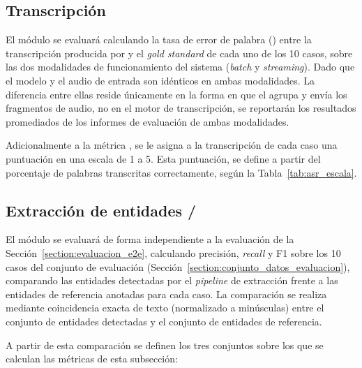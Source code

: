 \subsection{Transcripción }\label{subsection:evaluacion_asr}

El módulo  se evaluará calculando la tasa de error de palabra () entre la transcripción producida por  y el \textit{gold
standard} de cada uno de los 10 casos, sobre las dos modalidades de funcionamiento del sistema
(\textit{batch} y \textit{streaming}). Dado que el modelo  y el
audio de entrada son idénticos en ambas modalidades. La diferencia entre ellas reside únicamente
en la forma en que el  agrupa y envía los fragmentos de audio, no en el motor de
transcripción, se reportarán los resultados promediados de los informes de evaluación de ambas
modalidades.

Adicionalmente a la métrica , se le asigna a la transcripción de cada caso una
puntuación en una escala de 1 a 5. Esta puntuación, se define a partir
del porcentaje de palabras transcritas correctamente, según la Tabla~\ref{tab:asr_escala}.



\subsection{Extracción de entidades /}\label{subsection:evaluacion_pln}

El módulo  se evaluará de forma independiente a la evaluación
 de la Sección~\ref{section:evaluacion_e2e}, calculando precisión,
\textit{recall} y F1 sobre los 10 casos del conjunto de evaluación
(Sección~\ref{section:conjunto_datos_evaluacion}), comparando las entidades detectadas por el
\textit{pipeline} de extracción frente a las entidades de referencia anotadas para cada
caso. La comparación se realiza mediante coincidencia exacta de texto (normalizado a minúsculas)
entre el conjunto de entidades detectadas y el conjunto de entidades de referencia.

A partir de esta comparación se definen los tres conjuntos sobre los que se calculan las métricas de
esta subsección:



